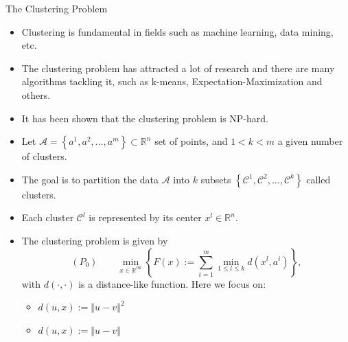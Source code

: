 \documentclass[9pt,handout]{beamer} %
\newcommand{\R}{\mathbb{R}} %
\newcommand{\norm}[1]{\left\Vert {#1} \right\Vert} %
\begin{document}
\begin{frame}{The Clustering Problem}
    	\begin{itemize}[<+->]
    		\item Clustering is fundamental in fields such as machine learning, data mining, etc.
    		\item The clustering problem has attracted a lot of research and there are many algorithms tackling it, such as k-means, Expectation-Maximization and others.
    		\item It has been shown that the clustering problem is NP-hard.
    		\item Let $\mathcal{A}=\left\{ a^1, a^2, \ldots, a^m \right\} \subset \R^n$ set of points, and $1<k<m$ a given number of clusters.
    		\item The goal is to partition the data $\mathcal{A}$ into $k$ subsets $\left\{ \mathcal{C}^1, \mathcal{C}^2, \ldots, \mathcal{C}^k \right\}$ called clusters.
    		\item Each cluster $\mathcal{C}^l$ is represented by its center $x^l \in \R^n$.
    	
    		\item The clustering problem is given by
    			\begin{equation*}
    				(P_0) \qquad \min\limits_{x \in \R^{nk}} \left\{ F(x) := \sum\limits_{i=1}^{m} \min\limits_{1 \le l \le k} d(x^l,a^i) \right\} ,
				\end{equation*}
				with $\textit{d}(\cdot ,\cdot)$ is a distance-like function.
				Here we focus on:
				\begin{itemize}[<+->]
					\item $d(u,x) := \norm{u-v}^2$
					\item $d(u,x) := \norm{u-v}$
				\end{itemize}
		\end{itemize}
		
    \end{frame}
    
\end{document}
